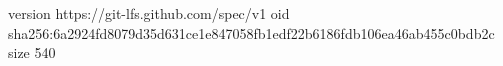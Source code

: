 version https://git-lfs.github.com/spec/v1
oid sha256:6a2924fd8079d35d631ce1e847058fb1edf22b6186fdb106ea46ab455c0bdb2c
size 540
